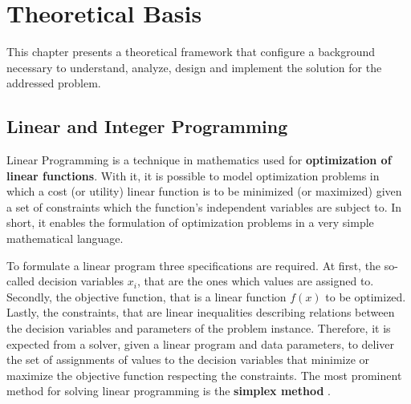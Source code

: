 \documentclass[tuberlin,cic,tc,openright,english,noabntcite,oneside]{iiufrgs}
\begin{document}
\chapter{Theoretical Basis}
This chapter presents a theoretical framework that configure a background necessary to understand, analyze, design and implement the solution for the addressed problem.


\section{Linear and Integer Programming}
Linear Programming is a technique in mathematics used for \textbf{optimization of linear functions}. With it, it is possible to model optimization problems in which a cost (or utility) linear function is to be minimized (or maximized) given a set of constraints which the function's independent variables are subject to. In short, it enables the formulation of optimization problems in a very simple mathematical language.

To formulate a linear program three specifications are required. At first, the so-called decision variables $x_{i}$, that are the ones which values are assigned to. Secondly, the objective function, that is a linear function $f(x)$ to be optimized. Lastly, the constraints, that are linear inequalities describing relations between the decision variables and parameters of the problem instance. Therefore, it is expected from a solver, given a linear program and data parameters, to deliver the set of assignments of values to the decision variables that minimize or maximize the objective function respecting the constraints. The most prominent method for solving linear programming is the \textbf{simplex method} \parencite[p. 5-6]{shenoy_linear_2007}.
\end{document}
